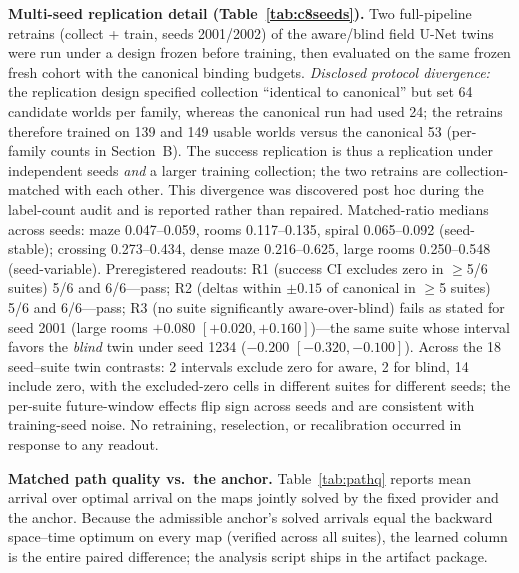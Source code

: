 \documentclass[letterpaper]{article} %
\begin{document}
\textbf{Multi-seed replication detail (Table~\ref{tab:c8seeds}).} Two full-pipeline retrains (collect + train, seeds 2001/2002) of the aware/blind field U-Net twins were run under a design frozen before training, then evaluated on the same frozen fresh cohort with the canonical binding budgets. \emph{Disclosed protocol divergence:} the replication design specified collection ``identical to canonical'' but set 64 candidate worlds per family, whereas the canonical run had used 24; the retrains therefore trained on 139 and 149 usable worlds versus the canonical 53 (per-family counts in Section~B). The success replication is thus a replication under independent seeds \emph{and} a larger training collection; the two retrains are collection-matched with each other. This divergence was discovered post hoc during the label-count audit and is reported rather than repaired. Matched-ratio medians across seeds: maze 0.047--0.059, rooms 0.117--0.135, spiral 0.065--0.092 (seed-stable); crossing 0.273--0.434, dense maze 0.216--0.625, large rooms 0.250--0.548 (seed-variable). Preregistered readouts: R1 (success CI excludes zero in $\geq$5/6 suites) 5/6 and 6/6---pass; R2 (deltas within $\pm 0.15$ of canonical in $\geq$5 suites) 5/6 and 6/6---pass; R3 (no suite significantly aware-over-blind) fails as stated for seed 2001 (large rooms $+0.080$ $[+0.020,+0.160]$)---the same suite whose interval favors the \emph{blind} twin under seed 1234 ($-0.200$ $[-0.320,-0.100]$). Across the 18 seed--suite twin contrasts: 2 intervals exclude zero for aware, 2 for blind, 14 include zero, with the excluded-zero cells in different suites for different seeds; the per-suite future-window effects flip sign across seeds and are consistent with training-seed noise. No retraining, reselection, or recalibration occurred in response to any readout.

\textbf{Matched path quality vs.\ the anchor.} Table~\ref{tab:pathq} reports mean arrival over optimal arrival on the maps jointly solved by the fixed provider and the anchor. Because the admissible anchor's solved arrivals equal the backward space--time optimum on every map (verified across all suites), the learned column is the entire paired difference; the analysis script ships in the artifact package.
\end{document}
